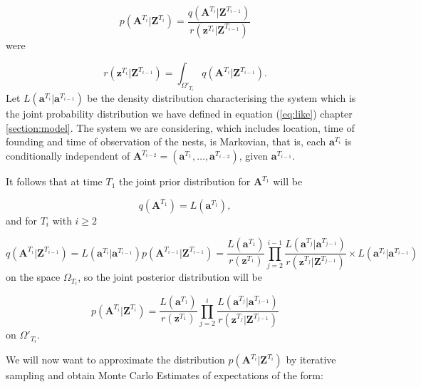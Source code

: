 \documentclass[11pt,a4paper]{article}
\renewcommand{\vec}[1]{\mathbf{#1}}
\begin{document}
\begin{equation*}
    p(\vec{A}^{T_i} | \vec{Z}^{T_i}) = \frac{q(\vec{A}^{T_i} | \vec{Z}^{T_{i-1}})}{r(\vec{z}^{T_i} | \vec{Z}^{T_{i-1}})}
\end{equation*}
were

\begin{equation*}
    r(\vec{z}^{T_i} | \vec{Z}^{T_{i-1}}) = \int_{\Omega'_{T_i}} q(\vec{A}^{T_i} | \vec{Z}^{T_{i-1}}).
\end{equation*}
Let $L(\vec{a}^{T_i} | \vec{a}^{T_{i-1}})$ be the density distribution characterising the system which is the joint probability distribution we have defined in equation (\ref{eq:like}) chapter  \ref{section:model}. The system we are considering, which includes location, time of founding and time of observation of the nests, is Markovian, that is, each $\vec{a}^{T_i}$ is conditionally independent of $\vec{A}^{T_{i-2}} = (\vec{a}^{T_1}, \ldots,\vec{a}^{T_{i-2}})$, given $\vec{a}^{T_{i-1}}$.

It follows that at time $T_1$ the joint prior distribution for $\vec{A}^{T_1}$ will be

\begin{equation*}
    q(\vec{A}^{T_1}) = L(\vec{a}^{T_1}),
\end{equation*}
and for $T_i$ with $i \geq 2$

\begin{equation*}
    q(\vec{A}^{T_i} | \vec{Z}^{T_{i-1}}) = L(\vec{a}^{T_i} | \vec{a}^{T_{i-1}}) p(\vec{A}^{T_{i-1}} | \vec{Z}^{T_{i-1}}) = \frac{L(\vec{a}^{T_1})}{r(\vec{z}^{T_1})} \prod_{j=2}^{i-1} \frac{L(\vec{a}^{T_j} | \vec{a}^{T_{j-1}})}{r(\vec{z}^{T_j} | \vec{Z}^{T_{j-1}})} \times L(\vec{a}^{T_i} | \vec{a}^{T_{i-1}})
\end{equation*}
on the space $\Omega_{T_i}$, so the joint posterior distribution will be

\begin{equation*}
    p(\vec{A}^{T_i} | \vec{Z}^{T_i}) = \frac{L(\vec{a}^{T_1})}{r(\vec{z}^{T_1})} \prod_{j=2}^{i} \frac{L(\vec{a}^{T_j} | \vec{a}^{T_{j-1}})}{r(\vec{z}^{T_j} | \vec{Z}^{T_{j-1}})}
\end{equation*}
on $\Omega'_{T_i}$.

We will now want to approximate the distribution $p(\vec{A}^{T_i} | \vec{Z}^{T_i})$ by iterative sampling and obtain Monte Carlo Estimates of expectations of the form:
\end{document}
